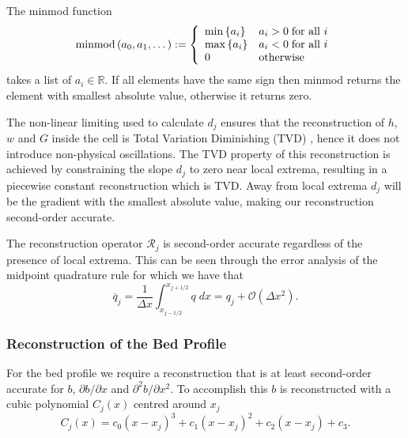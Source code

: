 \begin{defn}
The minmod function
\begin{equation*}
\text{minmod}\left(a_0,a_1,\dots\right) := \left\lbrace \begin{array}{l l}
\min\left\lbrace a_i\right\rbrace & a_i > 0 \; \text{for all } i \\
\max\left\lbrace a_i\right\rbrace & a_i < 0  \; \text{for all } i \\
0 & \text{otherwise}\\
\end{array} \right.
\end{equation*}
takes a list of $a_i \in \mathbb{R}$. If all elements have the same sign then minmod returns the element with smallest absolute value, otherwise it returns zero. 
\end{defn}
The non-linear limiting used to calculate $d_j$ ensures that the reconstruction of $h$, $w$ and $G$ inside the cell is Total Variation Diminishing (TVD) \cite{Harten-1983-357}, hence it does not introduce non-physical oscillations. The TVD property of this reconstruction is achieved by constraining the slope $d_j$ to zero near local extrema, resulting in a piecewise constant reconstruction which is TVD. Away from local extrema $d_j$ will be the gradient with the smallest absolute value, making our reconstruction second-order accurate.

The reconstruction operator $\mathcal{R}_{j} $ is second-order accurate regardless of the presence of local extrema. This can be seen through the error analysis of the midpoint quadrature rule \cite{Davis-Rabinowitz-1984} for which we have that
\begin{equation}
\overline{q}_j = \frac{1}{\Delta x} \int_{x_{j-1/2}}^{x_{j+1/2}} q \; dx = q_j + \mathcal{O}\left(\Delta x^2\right).
\end{equation}

\subsubsection{Reconstruction of the Bed Profile}
For the bed profile we require a reconstruction that is at least second-order accurate for $b$, $\partial b / \partial x$ and $\partial^2 b / \partial x^2$. To accomplish this $b$ is reconstructed with a cubic polynomial $C_j(x)$ centred around $x_j$
\begin{equation*}
C_j(x) = c_0 \left(x - x_j\right)^3 + c_1 \left(x - x_j\right)^2 + c_2 \left(x - x_j\right) + c_3.
\label{eqn:cubicforbedrecon}
\end{equation*}

